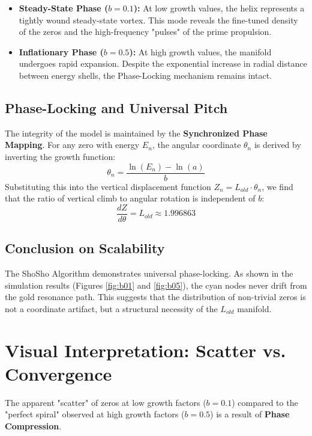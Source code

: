 \documentclass[11pt,a4paper]{article}
\begin{document}
\begin{itemize}
    \item \textbf{Steady-State Phase ($b = 0.1$):} At low growth values, the helix represents a tightly wound steady-state vortex. This mode reveals the fine-tuned density of the zeros and the high-frequency "pulses" of the prime propulsion.
    \item \textbf{Inflationary Phase ($b = 0.5$):} At high growth values, the manifold undergoes rapid expansion. Despite the exponential increase in radial distance between energy shells, the Phase-Locking mechanism remains intact.
\end{itemize}

\subsection{Phase-Locking and Universal Pitch}
The integrity of the model is maintained by the \textbf{Synchronized Phase Mapping}. For any zero with energy $E_n$, the angular coordinate $\theta_n$ is derived by inverting the growth function:
\begin{equation}
    \theta_n = \frac{\ln(E_n) - \ln(a)}{b}
\end{equation}
Substituting this into the vertical displacement function $Z_n = L_{old} \cdot \theta_n$, we find that the ratio of vertical climb to angular rotation is independent of $b$:
\begin{equation}
    \frac{dZ}{d\theta} = L_{old} \approx 1.996863
\end{equation}

\subsection{Conclusion on Scalability}
The ShoSho Algorithm demonstrates universal phase-locking. As shown in the simulation results (Figures \ref{fig:b01} and \ref{fig:b05}), the cyan nodes never drift from the gold resonance path. This suggests that the distribution of non-trivial zeros is not a coordinate artifact, but a structural necessity of the $L_{old}$ manifold.

\section{Visual Interpretation: Scatter vs. Convergence}

The apparent "scatter" of zeros at low growth factors ($b=0.1$) compared to the "perfect spiral" observed at high growth factors ($b=0.5$) is a result of \textbf{Phase Compression}.
\end{document}
